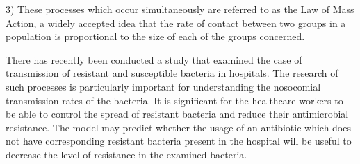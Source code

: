 3) These processes which occur simultaneously are referred to as the Law of Mass Action, a widely accepted idea that the rate of contact between two groups in a population is proportional to the size of each of the groups concerned\cite{per14}.

There has recently been conducted a study that examined the case of transmission of resistant and susceptible bacteria in hospitals. The research of such processes is particularly important for understanding the nosocomial transmission rates of the bacteria. It is significant for the healthcare workers to be able to control the spread of resistant bacteria and reduce their antimicrobial resistance. The model may predict whether the usage of an antibiotic which does not have corresponding resistant bacteria present in the hospital will be useful to decrease the level of resistance in the examined bacteria.
